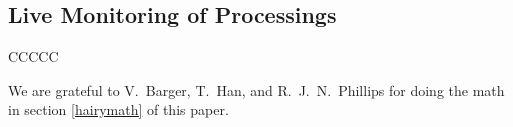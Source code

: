 \documentclass[11pt,twoside]{article}  %
\begin{document}
\subsection{Live Monitoring of Processings}
CCCCC

\acknowledgments

We are grateful to V.\ Barger, T.\ Han, and R.~J.~N.\ Phillips for doing
the math in section \ref{hairymath} of this paper.

%
%
%
\end{document}

